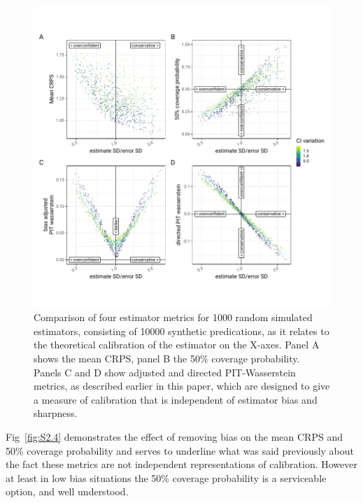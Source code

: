 \documentclass[a4paper, 12pt, twoside]{article}
\begin{document}
\begin{figure}[h!]
\centering
  \includegraphics{fig/fig3-metric-compare}
  \caption{Comparison of four estimator metrics for 1000 random simulated estimators, consisting of 10000 synthetic predications, as it relates to the theoretical calibration of the estimator on the X-axes. Panel A shows the mean CRPS, panel B the 50\% coverage probability. Panels C and D show adjusted and directed PIT-Wasserstein metrics, as described earlier in this paper, which are designed to give a measure of calibration that is independent of estimator bias and sharpness.}
\label{fig:S2.3}
\end{figure}

Fig~\ref{fig:S2.4} demonstrates the effect of removing bias on the mean CRPS and 50\% coverage probability and serves to underline what was said previously about the fact these metrics are not independent representations of calibration. However at least in low bias situations the 50\% coverage probability is a serviceable option, and well understood.
\end{document}
